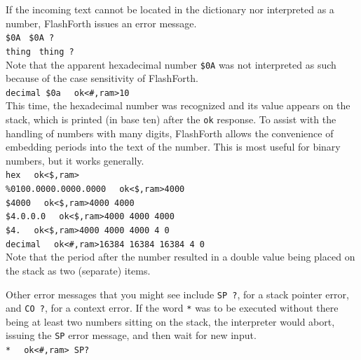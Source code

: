 \documentclass[12pt,a4paper]{article}
\begin{document}
\medskip
If the incoming text cannot be located in the dictionary nor interpreted as a number,
FlashForth issues an error message. \vspace{7pt} \\
\verb!$0A! \fbox{$\hookleftarrow$} \verb! $0A ?! \vspace{7pt} \\
\verb!thing! \fbox{$\hookleftarrow$} \verb! thing ?! \vspace{7pt} \\
Note that the apparent hexadecimal number \verb!$0A! was not interpreted as such 
because of the case sensitivity of FlashForth. \vspace{7pt} \\
\verb!decimal $0a! \fbox{$\hookleftarrow$} \verb!  ok<#,ram>10 ! \vspace{7pt} \\
This time, the hexadecimal number was recognized and its value appears on the stack,
which is printed (in base ten) after the \verb!ok! response.
To assist with the handling of numbers with many digits,
FlashForth allows the convenience of embedding periods into the text of the number.
This is most useful for binary numbers, but it works generally. \vspace{7pt} \\
\verb!hex! \fbox{$\hookleftarrow$} \verb!  ok<$,ram> ! \vspace{7pt} \\
\verb!%0100.0000.0000.0000! \fbox{$\hookleftarrow$} \verb!  ok<$,ram>4000 ! \vspace{7pt} \\
\verb!$4000! \fbox{$\hookleftarrow$} \verb!  ok<$,ram>4000 4000 ! \vspace{7pt} \\
\verb!$4.0.0.0! \fbox{$\hookleftarrow$} \verb!  ok<$,ram>4000 4000 4000 ! \vspace{7pt} \\
\verb!$4.! \fbox{$\hookleftarrow$} \verb!  ok<$,ram>4000 4000 4000 4 0 ! \vspace{7pt} \\
\verb!decimal! \fbox{$\hookleftarrow$} \verb!  ok<#,ram>16384 16384 16384 4 0 ! \vspace{7pt} \\
Note that the period after the number resulted in a double value being placed 
on the stack as two (separate) items.

\medskip
Other error messages that you might see include \verb!SP ?!, for a stack pointer error, 
and \verb!CO ?!, for a context error.
If the word \verb!*! was to be executed without there being at least two numbers sitting 
on the stack, the interpreter would abort, issuing the \verb!SP! error message, 
and then wait for new input. \vspace{7pt} \\
\verb!*  ! \fbox{$\hookleftarrow$} \verb!ok<#,ram> SP? ! 
\end{document}
